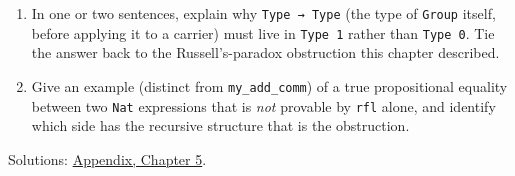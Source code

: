 \begin{enumerate}
\item
  In one or two sentences, explain why \texttt{Type → Type} (the type of \texttt{Group} itself, before applying it to a carrier) must live in \texttt{Type 1} rather than \texttt{Type 0}. Tie the answer back to the Russell's-paradox obstruction this chapter described.
\item
  Give an example (distinct from \texttt{my\_\allowbreak{}add\_\allowbreak{}comm}) of a true propositional equality between two \texttt{Nat} expressions that is \emph{not} provable by \texttt{rfl} alone, and identify which side has the recursive structure that is the obstruction.
\end{enumerate}

Solutions: \hyperref[sec:14-appendix-solutions:04-chapter-5:1]{Appendix, Chapter 5}.

